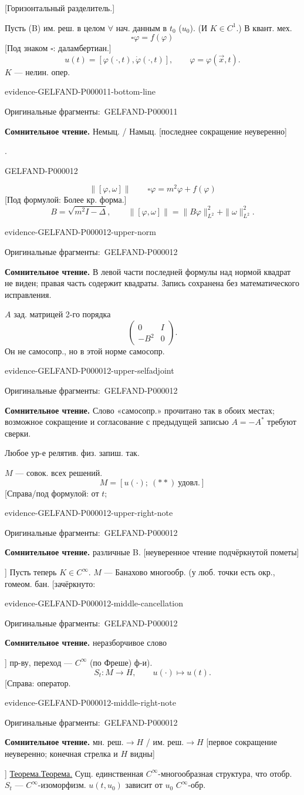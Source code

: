 \documentclass[11pt]{article}
\let\MathUnderline\underline
\renewcommand{\underline}[1]{\ifmmode\MathUnderline{#1}\else\uline{#1}\fi}
\newcommand{\SourcePage}[2]{\par\smallskip\phantomsection\label{#1:source-page}{\small\sffamily\color{blue!55!black}#1}\par\smallskip}
\newcommand{\EvidenceBlock}[4]{%
 \par\smallskip\noindent\begin{minipage}{\linewidth}
 \begin{minipage}[t]{.47\linewidth}\vspace{0pt}\centering
 \csname evidence-#1-#2\endcsname\par
 {\scriptsize\SourceCropCaption\ #1}\par
 \end{minipage}\hfill
 \begin{minipage}[t]{.49\linewidth}\vspace{0pt}\raggedright
 {\small\color{orange!65!black}\textbf{#4} #3}\par
 \end{minipage}
 \end{minipage}\par\smallskip}
\newcommand{\Unclear}[3]{\EvidenceBlock{#1}{#2}{#3}{\ReadingCaption}}
\newcommand{\SourceCropCaption}{Оригинальные фрагменты:}\newcommand{\ReadingCaption}{Сомнительное чтение.}\newcommand{\IncompleteCaption}{Неразобранный фрагмент.}\newcommand{\DiagramCaption}{Рисунок и набранное описание.}
\begin{document}
[Горизонтальный разделитель.]

Пусть (B) им. реш. в целом $\forall$ нач. данным в $t_0$ ($u_0$).
(И $K\in C^1$.)
В квант. мех.
\begin{equation*}
\square\varphi=f(\varphi)
\end{equation*}
[Под знаком $\square$: даламбертиан.]
\begin{equation*}
u(t)=[\varphi(\cdot,t),\dot\varphi(\cdot,t)],\qquad
\varphi=\varphi(\vec x,t).
\end{equation*}
$K$ --- нелин. опер. \Unclear{GELFAND-P000011}{bottom-line}{Немыц. / Намыц. [последнее сокращение неуверенно]}.



\SourcePage{GELFAND-P000012}{unlabelled}
\begin{equation*}
\|[\varphi,\omega]\|\qquad
\square\varphi=m^2\varphi+f(\varphi)
\end{equation*}
[Под формулой: Более кр. форма.]
\begin{equation*}
B=\sqrt{m^2I-\Delta},\qquad
\|[\varphi,\omega]\|=\|B\varphi\|_{L^2}^{2}+\|\omega\|_{L^2}^{2}.
\end{equation*}
\Unclear{GELFAND-P000012}{upper-norm}{В левой части последней формулы над нормой квадрат не виден; правая часть содержит квадраты. Запись сохранена без математического исправления.}
$A$ зад. матрицей 2-го порядка
\begin{equation*}
\begin{pmatrix}0&I\\-B^2&0\end{pmatrix}.
\end{equation*}
Он не самосопр., но в этой норме самосопр.
\Unclear{GELFAND-P000012}{upper-selfadjoint}{Слово «самосопр.» прочитано так в обоих местах; возможное сокращение и согласование с предыдущей записью $A=-A^*$ требуют сверки.}
Любое ур-е релятив. физ. запиш. так.

$M$ --- совок. всех решений.
\begin{equation*}
M=[u(\cdot);\ (**)\ \text{удовл.}]
\end{equation*}
[Справа/под формулой: от $t$; \Unclear{GELFAND-P000012}{upper-right-note}{различные B. [неуверенное чтение подчёркнутой пометы]}]
Пусть теперь $K\in C^\infty$.
$M$ --- Банахово многообр. (у люб. точки есть окр., гомеом. бан. [зачёркнуто: \Unclear{GELFAND-P000012}{middle-cancellation}{неразборчивое слово}] пр-ву, переход --- $C^\infty$ (по Фреше) ф-и).
\begin{equation*}
S_t:M\longrightarrow H,\qquad u(\cdot)\longmapsto u(t).
\end{equation*}
[Справа: оператор. \Unclear{GELFAND-P000012}{middle-right-note}{$\text{мн. реш.}\longrightarrow H$ / $\text{им. реш.}\longrightarrow H$ [первое сокращение неуверенно; конечная стрелка и $H$ видны]}]
\underline{Теорема.} Сущ. единственная $C^\infty$-многообразная структура, что отобр. $S_t$ --- $C^\infty$-изоморфизм.
$u(t,u_0)$ зависит от $u_0$ $C^\infty$-обр.
\end{document}
